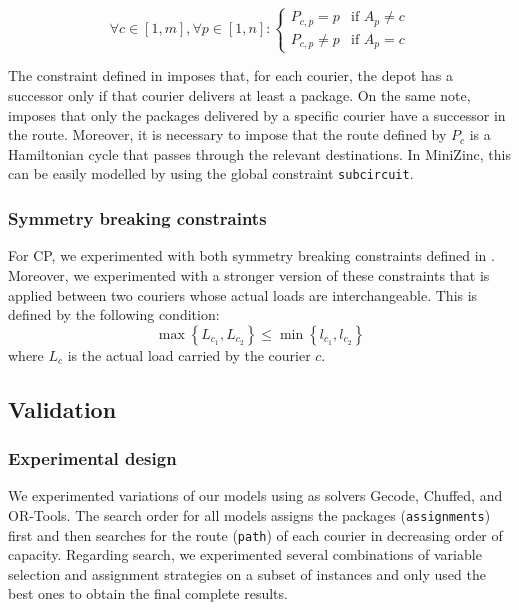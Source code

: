 \begin{equation}
    \label{eq:cp_constr_route_packs}
    \forall c \in [1, m],
    \forall p \in [1, n]: 
    \begin{cases}
        P_{c, p} = p    & \text{if $A_p \neq c$} \\
        P_{c, p} \neq p & \text{if $A_p = c$} 
    \end{cases}
\end{equation}

The constraint defined in  imposes that, for each courier, the depot has a successor only if that courier delivers at least a package. On the same note,  imposes that only the packages delivered by a specific courier have a successor in the route.
Moreover, it is necessary to impose that the route defined by $P_c$ is a Hamiltonian cycle that passes through the relevant destinations. In MiniZinc, this can be easily modelled by using the global constraint \texttt{subcircuit}.


\subsubsection{Symmetry breaking constraints}

For CP, we experimented with both symmetry breaking constraints defined in . Moreover, we experimented with a stronger version of these constraints that is applied between two couriers whose actual loads are interchangeable. This is defined by the following condition:
\begin{equation}
    \label{eq:cp_symm_strong}
    \max\left\{ L_{c_1}, L_{c_2} \right\} \leq \min\left\{ l_{c_1}, l_{c_2} \right\}
\end{equation}
where $L_c$ is the actual load carried by the courier $c$.



\subsection{Validation}

\subsubsection{Experimental design}

We experimented variations of our models using as solvers Gecode, Chuffed, and OR-Tools. The search order for all models assigns the packages (\texttt{assignments}) first and then searches for the route (\texttt{path}) of each courier in decreasing order of capacity. Regarding search, we experimented several combinations of variable selection and assignment strategies on a subset of instances and only used the best ones to obtain the final complete results.


